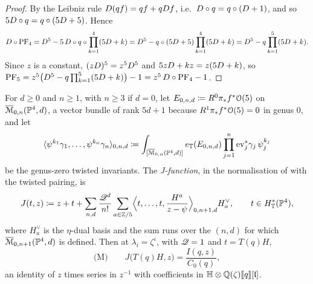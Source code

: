 \begin{proof}
By the Leibniz rule $D(qf)=qf+qD f$, i.e.\ $D\circ q=q\circ(D+1)$, and so $5D\circ q=q\circ(5D+5)$. Hence
\[
D\circ\mathrm{PF}_{4}=D^5-5\,D\circ q\circ\prod_{k=1}^4(5D+k)=D^5-q\circ(5D+5)\prod_{k=1}^4(5D+k)=D^5-q\prod_{k=1}^5(5D+k).
\]
Since $z$ is a constant, $(zD)^5=z^5D^5$ and $5zD+kz=z(5D+k)$, so $\mathrm{PF}_{5}=z^5\bigl(D^5-q\prod_{k=1}^5(5D+k)\bigr)-1=z^5\,D\circ\mathrm{PF}_{4}-1$.
\end{proof}

\begin{thm}
\label{thm:set-mirror}
For $d\geq0$ and $n\geq1$, with $n\geq3$ if $d=0$, let $E_{0,n,d}\coloneqq R^0\pi_*f^*\mathcal{O}(5)$ on $\overline{\mathcal M}_{0,n}(\mathbb{P}^4,d)$, a vector bundle of rank $5d+1$ because $R^1\pi_*f^*\mathcal{O}(5)=0$ in genus $0$, and let
\[
\langle\psi^{k_1}\gamma_1,\dots,\psi^{k_n}\gamma_n\rangle_{0,n,d}\coloneqq\int_{[\overline{\mathcal M}_{0,n}(\mathbb{P}^4,d)]}e_{\mathbb{T}}(E_{0,n,d})\prod_{j=1}^n\mathrm{ev}_j^*\gamma_j\,\psi_j^{k_j}
\]
be the genus-zero twisted invariants. The \emph{J-function}, in the normalisation of \cite[Section~6, (10)]{MR2276766} with the twisted pairing, is
\[
J(t,z)\coloneqq z+t+\sum_{n,d}\frac{\mathscr{Q}^d}{n!}\sum_{a\in\mathbb{Z}/5}\Bigl\langle t,\dots,t,\frac{H^a}{z-\psi}\Bigr\rangle_{0,n+1,d}H^\vee_a,\qquad t\in H^*_{\mathbb{T}}(\mathbb{P}^4),
\]
where $H^\vee_a$ is the $\eta$-dual basis and the sum runs over the $(n,d)$ for which $\overline{\mathcal M}_{0,n+1}(\mathbb{P}^4,d)$ is defined. Then at $\lambda_i=\zeta^i$, with $\mathscr{Q}=1$ and $t=T(q)H$,
\[
\text{(M)}\qquad J\bigl(T(q)H,z\bigr)=\frac{I(q,z)}{C_0(q)},
\]
an identity of $z$ times series in $z^{-1}$ with coefficients in $\mathbb{H}\otimes\mathbb{Q}(\zeta)[\![ q ]\!][\mathfrak{l}]$.
\end{thm}

